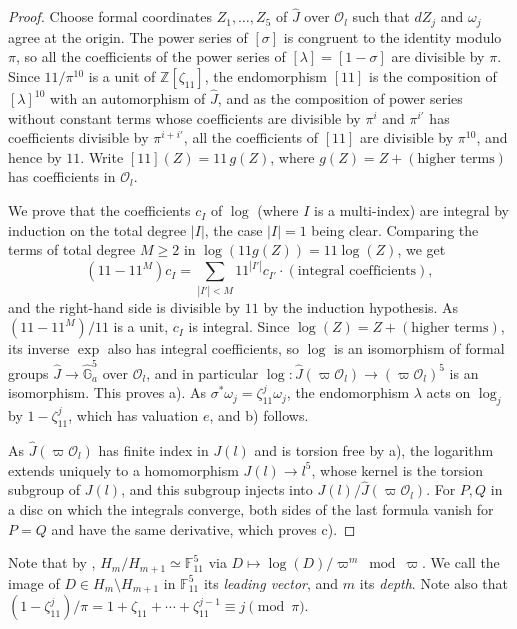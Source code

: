 \documentclass[11pt,reqno]{amsart}
\newcommand{\Z}{\mathbb{Z}}
\newcommand{\F}{\mathbb{F}}
\newcommand{\OO}{\mathcal{O}}
\newcommand{\Jhat}{\widehat{J}}
\theoremstyle{definition}
\numberwithin{equation}{section}
\begin{document}
\begin{proof}
Choose formal coordinates $Z_1,\ldots,Z_5$ of $\Jhat$ over $\OO_l$ such that $dZ_j$ and $\omega_j$ agree at the origin. The power series of $[\sigma]$ is congruent to the identity modulo $\pi$, so all the coefficients of the power series of $[\lambda]=[1-\sigma]$ are divisible by $\pi$. Since $11/\pi^{10}$ is a unit of $\Z[\zeta_{11}]$, the endomorphism $[11]$ is the composition of $[\lambda]^{10}$ with an automorphism of $\Jhat$, and as the composition of power series without constant terms whose coefficients are divisible by $\pi^{i}$ and $\pi^{i'}$ has coefficients divisible by $\pi^{i+i'}$, all the coefficients of $[11]$ are divisible by $\pi^{10}$, and hence by $11$. Write $[11](Z)=11\,g(Z)$, where $g(Z)=Z+(\text{higher terms})$ has coefficients in $\OO_l$.

We prove that the coefficients $c_I$ of $\log$ (where $I$ is a multi-index) are integral by induction on the total degree $|I|$, the case $|I|=1$ being clear. Comparing the terms of total degree $M\geq 2$ in $\log(11g(Z))=11\log(Z)$, we get
$$(11-11^M)c_I=\sum_{|I'|<M}11^{|I'|}c_{I'}\cdot(\text{integral coefficients}),$$
and the right-hand side is divisible by $11$ by the induction hypothesis. As $(11-11^M)/11$ is a unit, $c_I$ is integral. Since $\log(Z)=Z+(\text{higher terms})$, its inverse $\exp$ also has integral coefficients, so $\log$ is an isomorphism of formal groups $\Jhat\rightarrow\widehat{\mathbb G}_a^5$ over $\OO_l$, and in particular $\log\colon \Jhat(\varpi\OO_l)\rightarrow (\varpi\OO_l)^5$ is an isomorphism. This proves a). As $\sigma^*\omega_j=\zeta_{11}^j\omega_j$, the endomorphism $\lambda$ acts on $\log_j$ by $1-\zeta_{11}^j$, which has valuation $e$, and b) follows.

As $\Jhat(\varpi\OO_l)$ has finite index in $J(l)$ and is torsion free by a), the logarithm extends uniquely to a homomorphism $J(l)\rightarrow l^5$, whose kernel is the torsion subgroup of $J(l)$, and this subgroup injects into $J(l)/\Jhat(\varpi\OO_l)$. For $P,Q$ in a disc on which the integrals converge, both sides of the last formula vanish for $P=Q$ and have the same derivative, which proves c).
\end{proof}

Note that by , $H_m/H_{m+1}\simeq\F_{11}^5$ via $D\mapsto \log(D)/\varpi^m \bmod \varpi$. We call the image of $D\in H_m\setminus H_{m+1}$ in $\F_{11}^5$ its \textit{leading vector}, and $m$ its \textit{depth}. Note also that $(1-\zeta_{11}^j)/\pi=1+\zeta_{11}+\cdots+\zeta_{11}^{j-1}\equiv j\pmod \pi$.
\end{document}
